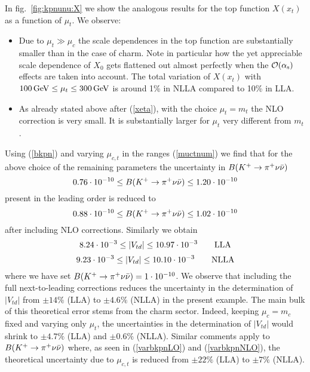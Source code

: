 \noindent
In fig.\ \ref{fig:kpnunu:X} we show the analogous results for the top
function $X(x_t)$ as a function of $\mu_t$. We observe:
\begin{itemize}
\item
Due to $\mu_t\gg\mu_c$ the scale dependences in the top function
are substantially smaller than in the case of charm.
Note in particular how the yet appreciable scale dependence of $X_0$
gets flattened out almost perfectly when the ${\cal O}(\alpha_{\rm s})$
effects are taken into account. The total variation of $X(x_t)$
with $100\, {\rm GeV}\leq\mu_t\leq 300\, {\rm GeV}$ is around 1\% in NLLA compared
to 10\% in LLA.
\item
As already stated above after (\ref{xeta}), with the choice
$\mu_t=m_t$ the NLO correction is very small. It is substantially
larger for $\mu_t$ very different from $m_t$.
\end{itemize}
Using (\ref{bkpn}) and varying $\mu_{c, t}$ in the ranges
(\ref{muctnum}) we find that for the above choice of the remaining
parameters the uncertainty in $B(K^+ \to \pi^+\nu\bar\nu)$
\begin{equation}\label{varbkpnLO}
0.76\cdot 10^{-10}\leq B(K^+ \to \pi^+\nu\bar\nu)\leq 1.20\cdot 10^{-10}
\end{equation}
present in the leading order is reduced to
\begin{equation}\label{varbkpnNLO}
0.88\cdot 10^{-10}\leq B(K^+ \to \pi^+\nu\bar\nu)\leq 1.02\cdot 10^{-10}
\end{equation}
after including NLO corrections. Similarly we obtain
\begin{equation}\label{varvtdLO}
8.24\cdot 10^{-3}\leq |V_{td}|\leq 10.97\cdot 10^{-3} \qquad {\rm LLA}
\end{equation}
\begin{equation}\label{varvtdNLO}
9.23\cdot 10^{-3}\leq |V_{td}|\leq 10.10\cdot 10^{-3}  \qquad {\rm NLLA}
\end{equation}
where we have set $B(K^+ \to \pi^+\nu\bar\nu)=1\cdot 10^{-10}$. We observe that including
the full next-to-leading corrections reduces the uncertainty in the
determination of $|V_{td}|$ from $\pm 14\%$ (LLA) to $\pm 4.6\%$ (NLLA)
in the present example. The main bulk of this theoretical error stems
from the charm sector. Indeed, keeping $\mu_c=m_c$ fixed and varying
only $\mu_t$, the uncertainties in the determination of $|V_{td}|$
would shrink to $\pm 4.7\%$ (LLA) and $\pm 0.6\%$ (NLLA).
Similar comments apply to $B(K^+ \to \pi^+\nu\bar\nu)$ where, as seen in
(\ref{varbkpnLO}) and (\ref{varbkpnNLO}), the theoretical uncertainty
due to $\mu_{c,t}$ is reduced from $\pm 22\%$ (LLA) to $\pm 7\%$ (NLLA).

